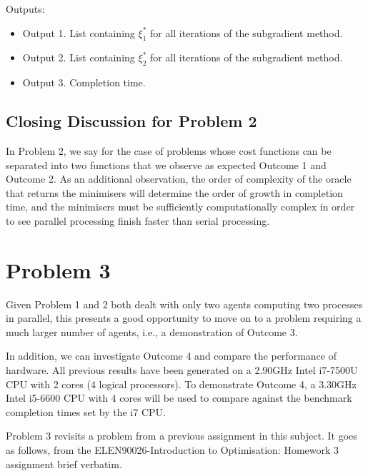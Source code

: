 \documentclass[12pt]{article}
\begin{document}
Outputs:
\begin{itemize}
	\item Output 1. List containing $\xi_1^*$ for all iterations of the subgradient method.
	\item Output 2. List containing $\xi_2^*$ for all iterations of the subgradient method.
	\item Output 3. Completion time.
\end{itemize}

\subsection*{Closing Discussion for Problem 2}

In Problem 2, we say for the case of problems whose cost functions can be separated into two functions that we observe as expected Outcome 1 and Outcome 2. As an additional observation, the order of complexity of the oracle that returns the minimisers will determine the order of growth in completion time, and the minimisers must be sufficiently computationally complex in order to see parallel processing finish faster than serial processing.

\section*{Problem 3}

Given Problem 1 and 2 both dealt with only two agents computing two processes in parallel, this presents a good opportunity to move on to a problem requiring a much larger number of agents, i.e., a demonstration of Outcome 3.

In addition, we can investigate Outcome 4 and compare the performance of hardware. All previous results have been generated on a 2.90GHz Intel i7-7500U CPU with 2 cores (4 logical processors). To demonstrate Outcome 4, a 3.30GHz Intel i5-6600 CPU with 4 cores will be used to compare against the benchmark completion times set by the i7 CPU.

Problem 3 revisits a problem from a previous assignment in this subject. It goes as follows, from the ELEN90026-Introduction to Optimisation: Homework 3 assignment brief verbatim.
\end{document}
